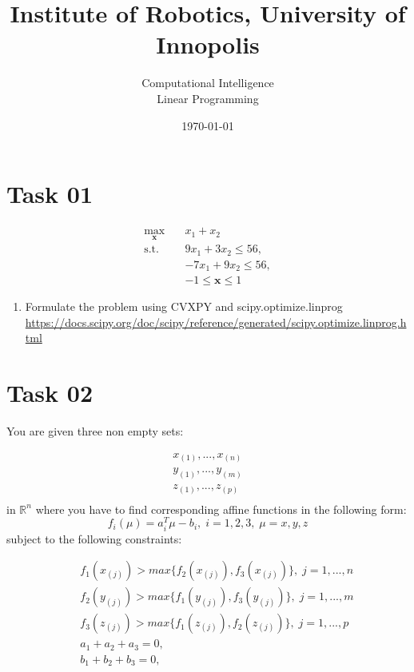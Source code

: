 \documentclass[12pt]{article}%
\begin{document}
\title{Institute of Robotics,  University of Innopolis}
\author{Computational Intelligence \\ Linear Programming}
\date{\today}
\maketitle

\section{Task 01}

\begin{equation}
\begin{aligned}
\max_{\mathbf{x}} \quad & x_1 + x_2\\
\textrm{s.t.} \quad & 9x_1 + 3x_2 \leq 56,\\
 \quad & -7x_1 + 9x_2 \leq 56,\\
 \quad & -1 \leq \mathbf{x} \leq 1
\end{aligned}
\end{equation}

\begin{enumerate}
    \item Formulate the problem using CVXPY and scipy.optimize.linprog \url{https://docs.scipy.org/doc/scipy/reference/generated/scipy.optimize.linprog.html}
\end{enumerate}


\section{Task 02}

You are given three non empty sets:

\begin{equation*}
\begin{aligned}
x_{(1)},...,x_{(n)} \\
y_{(1)},...,y_{(m)} \\
z_{(1)},...,z_{(p)} \\
\end{aligned}
\end{equation*} in $\mathbb{R}^n$ where you have to find corresponding affine functions in the following form:
\begin{equation}\label{eq:line}
    f_i(\mu) = a_i^T\mu -b_i, \; i=1,2,3, \; \mu = x,y,z
\end{equation} subject to the following constraints:

\begin{equation*}
\begin{aligned}
\quad & f_1(x_{(j)}) > max \{f_2(x_{(j)}), f_3(x_{(j)})\}, \; j = 1,...,n\,\\
  \quad & f_2(y_{(j)}) > max \{f_1(y_{(j)}), f_3(y_{(j)})\}, \; j = 1,...,m\,\\
  \quad & f_3(z_{(j)}) > max \{f_1(z_{(j)}), f_2(z_{(j)})\}, \; j = 1,...,p\,\\
 \quad & a_1 + a_2 + a_3 = 0, \\
 \quad & b_1 + b_2 + b_3 = 0 ,
\end{aligned}
\end{equation*}
\end{document}
